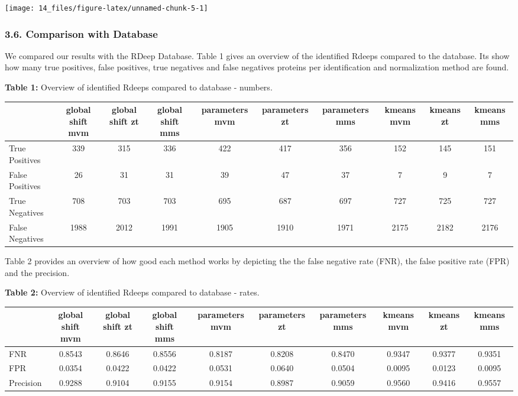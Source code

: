 \documentclass[
  12pt,
]{article}
\begin{document}
\texttt{[image: 14\_files/figure-latex/unnamed-chunk-5-1]}

\hypertarget{comparison-with-database}{%
\subsubsection{3.6. Comparison with
Database}\label{comparison-with-database}}

We compared our results with the RDeep Database. Table 1 gives an
overview of the identified Rdeeps compared to the database. Its show how
many true positives, false positives, true negatives and false negatives
proteins per identification and normalization method are found.

\textbf{Table 1:} Overview of identified Rdeeps compared to database -
numbers.

\begin{table}
\centering
\begin{tabular}{l|c|c|c|c|c|c|c|c|c}
\hline
  & global shift mvm & global shift zt & global shift mms & parameters mvm & parameters zt & parameters mms & kmeans mvm & kmeans zt & kmeans mms\\
\hline
True Positives & 339 & 315 & 336 & 422 & 417 & 356 & 152 & 145 & 151\\
\hline
False Positives & 26 & 31 & 31 & 39 & 47 & 37 & 7 & 9 & 7\\
\hline
True Negatives & 708 & 703 & 703 & 695 & 687 & 697 & 727 & 725 & 727\\
\hline
False Negatives & 1988 & 2012 & 1991 & 1905 & 1910 & 1971 & 2175 & 2182 & 2176\\
\hline
\end{tabular}
\end{table}

Table 2 provides an overview of how good each method works by depicting
the the false negative rate (FNR), the false positive rate (FPR) and the
precision.

\textbf{Table 2:} Overview of identified Rdeeps compared to database -
rates.

\begin{table}
\centering
\begin{tabular}{l|c|c|c|c|c|c|c|c|c}
\hline
  & global shift mvm & global shift zt & global shift mms & parameters mvm & parameters zt & parameters mms & kmeans mvm & kmeans zt & kmeans mms\\
\hline
FNR & 0.8543 & 0.8646 & 0.8556 & 0.8187 & 0.8208 & 0.8470 & 0.9347 & 0.9377 & 0.9351\\
\hline
FPR & 0.0354 & 0.0422 & 0.0422 & 0.0531 & 0.0640 & 0.0504 & 0.0095 & 0.0123 & 0.0095\\
\hline
Precision & 0.9288 & 0.9104 & 0.9155 & 0.9154 & 0.8987 & 0.9059 & 0.9560 & 0.9416 & 0.9557\\
\hline
\end{tabular}
\end{table}
\end{document}
